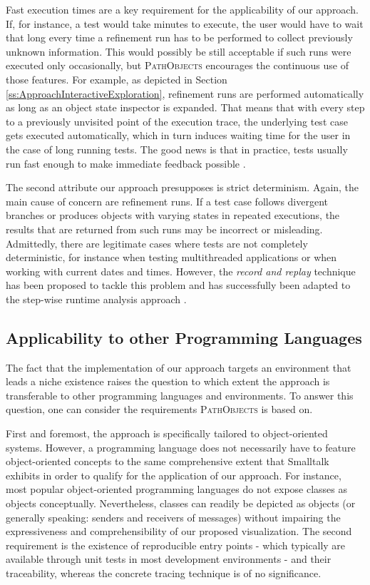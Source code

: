 Fast execution times are a key requirement for the applicability of our approach.
If, for instance, a test would take minutes to execute, the user would have to wait that long every time a refinement run has to be performed to collect previously unknown information.
This would possibly be still acceptable if such runs were executed only occasionally, but \textsc{PathObjects} encourages the continuous use of those features.
For example, as depicted in Section \ref{ss:ApproachInteractiveExploration}, refinement runs are performed automatically as long as an object state inspector is expanded.
That means that with every step to a previously unvisited point of the execution trace, the underlying test case gets executed automatically, which in turn induces waiting time for the user in the case of long running tests. The good news is that in practice, tests usually run fast enough to make immediate feedback possible \cite{perscheid_immediacy_2010}.

The second attribute our approach presupposes is strict determinism.
Again, the main cause of concern are refinement runs.
If a test case follows divergent branches or produces objects with varying states in repeated executions, the results that are returned from such runs may be incorrect or misleading.
Admittedly, there are legitimate cases where tests are not completely deterministic, for instance when testing multithreaded applications or when working with current dates and times.
However, the \emph{record and replay} technique has been proposed to tackle this problem \cite{choi_deterministic_1998} and has successfully been adapted to the step-wise runtime analysis approach \cite{felgentreff_comparison_2012}.

\subsection{Applicability to other Programming Languages}
\label{ss:DiscussionApplicability}
The fact that the implementation of our approach targets an environment that leads a niche existence raises the question to which extent the approach is transferable to other programming languages and environments.
To answer this question, one can consider the requirements \textsc{PathObjects} is based on.

First and foremost, the approach is specifically tailored to object-oriented systems.
However, a programming language does not necessarily have to feature object-oriented concepts to the same comprehensive extent that Smalltalk exhibits in order to qualify for the application of our approach.
For instance, most popular object-oriented programming languages do not expose classes as objects conceptually. 
Nevertheless, classes can readily be depicted as objects (or generally speaking: senders and receivers of messages) without impairing the expressiveness and comprehensibility of our proposed visualization.
The second requirement is the existence of reproducible entry points - which typically are available through unit tests in most development environments - and their traceability, whereas the concrete tracing technique is of no significance.

